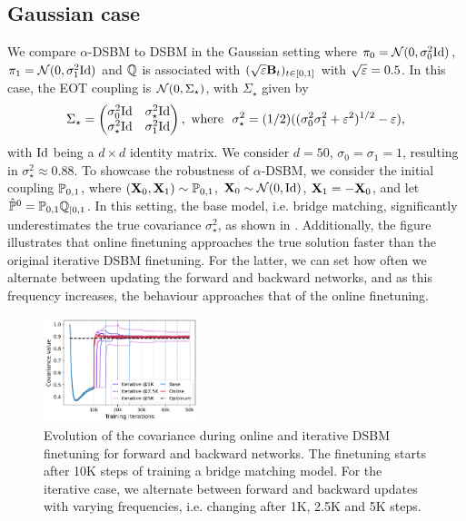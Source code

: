 \documentclass{article}
\begin{document}
\subsection{Gaussian case}
\label{sec:gaussian_case}


We compare $\alpha$-DSBM to DSBM in the Gaussian setting where $\pi_0 = \mathcal{N}(0, \sigma_0^2 \mathrm{Id})$, $\pi_1 = \mathcal{N}(0, \sigma_1^2 \mathrm{Id})$ and $\mathbb{Q}$ is associated with $(\sqrt{\varepsilon} \mathbf{B}_t)_{t \in [0,1]}$ with $\sqrt {\varepsilon} = 0.5$. In this case, the EOT coupling is $\mathcal{N}(0, \Sigma_\star)$, with $\Sigma_\star$ given by 
\begin{equation}
    \Sigma_\star = \left( \begin{matrix} \sigma_0^2 \mathrm{Id} & \sigma_\star^2 \mathrm{Id} \\ \sigma_\star^2 \mathrm{Id} & \sigma_1^2 \mathrm{Id} \end{matrix} \right) ,~\textup{where~~}\sigma_\star^2 = (1/2)((\sigma_0^2 \sigma_1^2 + \varepsilon^2)^{1/2} - \varepsilon),
\end{equation}
with $\mathrm{Id}$ being a $d \times d$ identity matrix. We consider $d=50$, $\sigma_0 = \sigma_1 =1$, resulting in $\sigma_\star^2 \approx 0.88$. To showcase the robustness of $\alpha$-DSBM, we consider the initial coupling $\mathbb{P}_{0,1}$, where $(\mathbf{X}_0, \mathbf{X}_1) \sim \mathbb{P}_{0,1}$, $\mathbf{X}_0 \sim \mathcal{N}(0, \mathrm{Id})$, $\mathbf{X}_1 = -\mathbf{X}_0$, and let $\hat{\mathbb{P}}^0 = \mathbb{P}_{0,1} \mathbb{Q}_{|0,1}$. In this setting, the base model, i.e. bridge matching, significantly underestimates the true covariance $\sigma_\star^2$, as shown in . Additionally, the figure illustrates that online finetuning approaches the true solution faster than the original iterative DSBM finetuning. For the latter, we can set how often we alternate between updating the forward and backward networks, and as this frequency increases, the behaviour approaches that of the online finetuning. 


\begin{figure}
\centering
    \includegraphics[width=0.4\textwidth]{img/gaussian/gaussian_ira_100nfe.png}
    \caption{Evolution of the covariance during online and iterative DSBM finetuning for forward and backward networks. The finetuning starts after 10K steps of training a bridge matching model. For the iterative case, we alternate between forward and backward updates with varying frequencies, i.e. changing after 1K, 2.5K and 5K steps. }
    \label{fig:gaussian_case_antithetic}
\end{figure}
\end{document}
